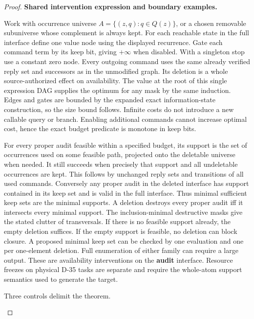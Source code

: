\begin{proof}
\textbf{Shared intervention expression and boundary examples.}

Work with occurrence universe \(A=\{(z,q):q\in Q(z)\}\), or a chosen removable subuniverse whose complement is always kept. For each reachable state in the full interface define one value node using the displayed recurrence. Gate each command term by its keep bit, giving \(+\infty\) when disabled. With a singleton stop use a constant zero node. Every outgoing command uses the same already verified reply set and successors as in the unmodified graph. Its deletion is a whole source-authorized effect on availability. The value at the root of this single expression DAG supplies the optimum for any mask by the same induction. Edges and gates are bounded by the expanded exact information-state construction, so the size bound follows. Infinite costs do not introduce a new callable query or branch. Enabling additional commands cannot increase optimal cost, hence the exact budget predicate is monotone in keep bits.

For every proper audit feasible within a specified budget, its support is the set of occurrences used on some feasible path, projected onto the deletable universe when needed. It still succeeds when precisely that support and all undeletable occurrences are kept. This follows by unchanged reply sets and transitions of all used commands. Conversely any proper audit in the deleted interface has support contained in its keep set and is valid in the full interface. Thus minimal sufficient keep sets are the minimal supports. A deletion destroys every proper audit iff it intersects every minimal support. The inclusion-minimal destructive masks give the stated clutter of transversals. If there is no feasible support already, the empty deletion suffices. If the empty support is feasible, no deletion can block closure. A proposed minimal keep set can be checked by one evaluation and one per one-element deletion. Full enumeration of either family can require a large output. These are availability interventions on the \textbf{audit} interface. Resource freezes on physical D-35 tasks are separate and require the whole-atom support semantics used to generate the target.

Three controls delimit the theorem.

\begin{enumerate}
\def\labelenumi{\arabic{enumi}.}


\end{enumerate}
\end{proof}
